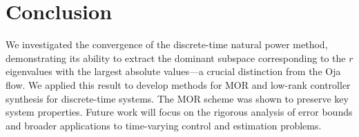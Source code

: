 \documentclass{ifacconf}
\begin{document}
\section{Conclusion}
\label{sec:conclusion}
	
	
	We investigated the convergence of the discrete-time natural power method, demonstrating its ability to extract the dominant subspace corresponding to the $r$ eigenvalues with the largest absolute values—a crucial distinction from the Oja flow. We applied this result to develop methods for MOR and low-rank controller synthesis for discrete-time systems. The MOR scheme was shown to preserve key system properties. Future work will focus on the rigorous analysis of error bounds and broader applications to time-varying control and estimation problems.
	
\end{document}
